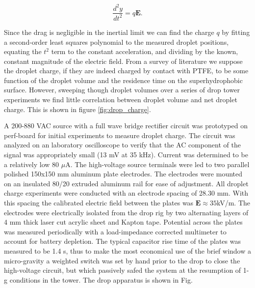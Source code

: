 \documentclass[a4paper, 12pt]{article}
\begin{document}
\[ \frac{d^2y}{dt^2} = q\mathbf{E}. \]

Since the drag is negligible in the inertial limit we can find the charge $q$ by fitting a second-order least squares polynomial to the measured droplet positions, equating the $t^2$ term to the constant acceleration, and dividing by the known, constant magnitude of the electric field. From a survey of literature we suppose the droplet charge, if they are indeed charged by contact with PTFE, to be some function of the droplet volume and the residence time on the superhydrophobic surface. However, sweeping though droplet volumes over a series of drop tower experiments we find little correlation between droplet volume  and net droplet charge. This is shown in figure \ref{fig:drop_charge}.

A 200-880 VAC source with a full wave bridge rectifier circuit was prototyped on perf-board for initial experiments to measure droplet charge. The circuit was analyzed on an laboratory oscilloscope to verify that the AC component of the signal was appropriately small (13 mV at 35 kHz). Current was determined to be a relatively low 80 $\mu$A. The high-voltage source terminals were led to two parallel polished 150x150 mm aluminum plate electrodes. The electrodes were mounted on an insulated 80/20 extruded aluminum rail for ease of adjustment. All droplet charge experiments were conducted with an electrode spacing of 28.30 mm. With this spacing the calibrated electric field between the plates was $\mathbf{E} \approx 35$kV/m. The electrodes were electrically isolated from the drop rig by two alternating layers of 4 mm thick laser cut acrylic sheet and Kapton tape. Potential across the plates was measured periodically with a load-impedance corrected multimeter to account for battery depletion. The typical capacitor rise time of the plates was measured to be 1.4 s, thus to make the most economical use of the brief window a micro-gravity a weighted switch was set by hand prior to the drop to close the high-voltage circuit, but which passively safed the system at the resumption of 1-g conditions in the tower. The drop apparatus is shown in Fig.



\end{document}

